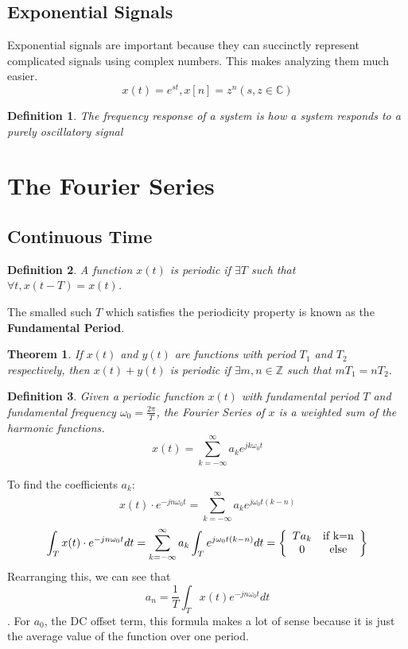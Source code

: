 \documentclass{article}
\newtheorem{theorem}{Theorem}
\newtheorem{definition}{Definition}
\begin{document}
\subsection{Exponential Signals}
Exponential signals are important because they can succinctly represent
complicated signals using complex numbers. This makes analyzing them much easier.
$$x(t) = e^{st}, x[n] = z^n (s, z \in \mathbb{C})$$
\begin{definition}
    The frequency response of a system is how a system responds to a purely oscillatory signal
\end{definition}
\section{The Fourier Series}
\subsection{Continuous Time}
\begin{definition}
    A function $x(t)$ is periodic if $\exists T$ such that $\forall t, x(t-T)=x(t)$.
\end{definition}
The smalled such $T$ which satisfies the periodicity property is known as the \textbf{Fundamental Period}.
\begin{theorem}
    If $x(t)$ and $y(t)$ are functions with period $T_1$ and $T_2$ respectively, then $x(t)+y(t)$ is periodic
    if $\exists m, n \in \mathbb{Z}$ such that $mT_1 = nT_2$.
\end{theorem}
\begin{definition}
    Given a periodic function $x(t)$ with fundamental period $T$ and fundamental frequency $\omega_0=\frac{2\pi}{T}$,
    the Fourier Series of $x$ is a weighted sum of the harmonic functions.
    $$x(t) = \sum_{k=-\infty}^{\infty}{a_ke^{jk\omega_0t}}$$
\end{definition}
To find the coefficients $a_k$:
$$x(t) \cdot e^{-jn\omega_0t} = \sum_{k=-\infty}^{\infty}{a_ke^{j\omega_0t(k-n)}}$$
\[
    \int_{T}{x(t) \cdot e^{-jn\omega_0t}dt} = \sum_{k=-\infty}^{\infty}{a_k\int_{T}{e^{j\omega_0t(k-n)}}dt}
    = \left\{
        \begin{array}{cc}
            Ta_k & \text{if }$k=n$\\
            0 & \text{else}
        \end{array}
    \right\}
\]
Rearranging this, we can see that
$$a_n = \frac{1}{T}\int_{T}{x(t)e^{-jn\omega_0t}dt}$$.
For $a_0$, the DC offset term, this formula makes a lot of sense because it is just the average value of the function over one period.
\end{document}
